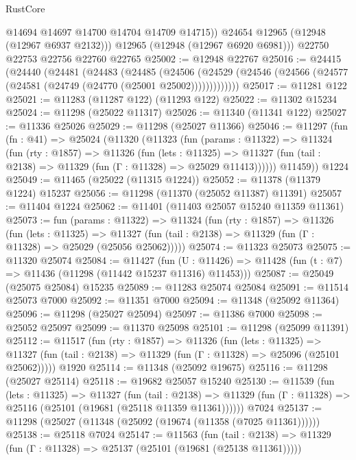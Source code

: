 \begin{lexlean}{RustCore}
\begin{coremodule}
            @14694
            @14697
            @14700
            @14704
            @14709
            @14715))
        @24654
        @12965
        (@12948 (@12967 @6937 @2132)))
      @12965
      (@12948 (@12967 @6920 @6981)))
    @22750
    @22753
    @22756
    @22760
    @22765
@25002 := @12948 @22767
@25016 := @24415
    (@24440
      (@24481
        (@24483
          (@24485
            (@24506
              (@24529 (@24546 (@24566 (@24577 (@24581 (@24749 (@24770 (@25001 @25002)))))))))))))
@25017 := @11281 @122
@25021 := @11283 (@11287 @122) (@11293 @122)
@25022 := @11302 @15234
@25024 := @11298 (@25022 @11317)
@25026 := @11340 (@11341 @122)
@25027 := @11336 @25026
@25029 := @11298 (@25027 @11366)
@25046 := @11297
    (fun (fn : @41) =>
    @25024
      (@11320
        (@11323
          (fun (params : @11322) =>
          @11324
            (fun (rty : @1857) =>
            @11326
              (fun (lets : @11325) =>
              @11327 (fun (tail : @2138) => @11329 (fun (Γ : @11328) => @25029 @11413))))))
        @11459))
    @1224
@25049 := @11465 (@25022 (@11315 @1224))
@25052 := @11378 (@11379 @1224) @15237
@25056 := @11298 (@11370 (@25052 @11387) @11391)
@25057 := @11404 @1224
@25062 := @11401 (@11403 @25057 @15240 @11359 @11361)
@25073 := fun (params : @11322) =>
  @11324
    (fun (rty : @1857) =>
    @11326
      (fun (lets : @11325) =>
      @11327 (fun (tail : @2138) => @11329 (fun (Γ : @11328) => @25029 (@25056 @25062)))))
@25074 := @11323 @25073
@25075 := @11320 @25074
@25084 := @11427
    (fun (U : @11426) => @11428 (fun (t : @7) => @11436 (@11298 (@11442 @15237 @11316) @11453)))
@25087 := @25049 (@25075 @25084) @15235
@25089 := @11283 @25074 @25084
@25091 := @11514 @25073 @7000
@25092 := @11351 @7000
@25094 := @11348 (@25092 @11364)
@25096 := @11298 (@25027 @25094)
@25097 := @11386 @7000
@25098 := @25052 @25097
@25099 := @11370 @25098
@25101 := @11298 (@25099 @11391)
@25112 := @11517
    (fun (rty : @1857) =>
    @11326
      (fun (lets : @11325) =>
      @11327 (fun (tail : @2138) => @11329 (fun (Γ : @11328) => @25096 (@25101 @25062)))))
    @1920
@25114 := @11348 (@25092 @19675)
@25116 := @11298 (@25027 @25114)
@25118 := @19682 @25057 @15240
@25130 := @11539
    (fun (lets : @11325) =>
    @11327
      (fun (tail : @2138) =>
      @11329 (fun (Γ : @11328) => @25116 (@25101 (@19681 (@25118 @11359 @11361))))))
    @7024
@25137 := @11298 (@25027 (@11348 (@25092 (@19674 (@11358 (@7025 @11361))))))
@25138 := @25118 @7024
@25147 := @11563
    (fun (tail : @2138) => @11329 (fun (Γ : @11328) => @25137 (@25101 (@19681 (@25138 @11361)))))

\end{coremodule}
\end{lexlean}
